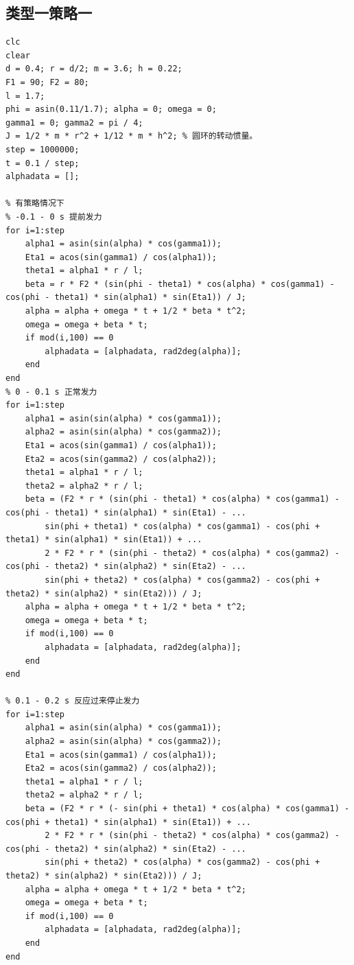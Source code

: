\documentclass{cumcm}
\begin{document}
\subsection{类型一策略一}
\begin{lstlisting}
clc
clear
d = 0.4; r = d/2; m = 3.6; h = 0.22;
F1 = 90; F2 = 80;
l = 1.7;
phi = asin(0.11/1.7); alpha = 0; omega = 0;
gamma1 = 0; gamma2 = pi / 4;
J = 1/2 * m * r^2 + 1/12 * m * h^2; % 圆环的转动惯量。
step = 1000000;
t = 0.1 / step;
alphadata = [];

% 有策略情况下
% -0.1 - 0 s 提前发力
for i=1:step
    alpha1 = asin(sin(alpha) * cos(gamma1));
    Eta1 = acos(sin(gamma1) / cos(alpha1));
    theta1 = alpha1 * r / l;
    beta = r * F2 * (sin(phi - theta1) * cos(alpha) * cos(gamma1) - cos(phi - theta1) * sin(alpha1) * sin(Eta1)) / J;
    alpha = alpha + omega * t + 1/2 * beta * t^2;
    omega = omega + beta * t;
    if mod(i,100) == 0
        alphadata = [alphadata, rad2deg(alpha)];
    end
end
% 0 - 0.1 s 正常发力
for i=1:step
    alpha1 = asin(sin(alpha) * cos(gamma1));
    alpha2 = asin(sin(alpha) * cos(gamma2));
    Eta1 = acos(sin(gamma1) / cos(alpha1));
    Eta2 = acos(sin(gamma2) / cos(alpha2));
    theta1 = alpha1 * r / l;
    theta2 = alpha2 * r / l;
    beta = (F2 * r * (sin(phi - theta1) * cos(alpha) * cos(gamma1) - cos(phi - theta1) * sin(alpha1) * sin(Eta1) - ...
        sin(phi + theta1) * cos(alpha) * cos(gamma1) - cos(phi + theta1) * sin(alpha1) * sin(Eta1)) + ...
        2 * F2 * r * (sin(phi - theta2) * cos(alpha) * cos(gamma2) - cos(phi - theta2) * sin(alpha2) * sin(Eta2) - ...
        sin(phi + theta2) * cos(alpha) * cos(gamma2) - cos(phi + theta2) * sin(alpha2) * sin(Eta2))) / J;
    alpha = alpha + omega * t + 1/2 * beta * t^2;
    omega = omega + beta * t;
    if mod(i,100) == 0
        alphadata = [alphadata, rad2deg(alpha)];
    end
end

% 0.1 - 0.2 s 反应过来停止发力
for i=1:step
    alpha1 = asin(sin(alpha) * cos(gamma1));
    alpha2 = asin(sin(alpha) * cos(gamma2));
    Eta1 = acos(sin(gamma1) / cos(alpha1));
    Eta2 = acos(sin(gamma2) / cos(alpha2));
    theta1 = alpha1 * r / l;
    theta2 = alpha2 * r / l;
    beta = (F2 * r * (- sin(phi + theta1) * cos(alpha) * cos(gamma1) - cos(phi + theta1) * sin(alpha1) * sin(Eta1)) + ...
        2 * F2 * r * (sin(phi - theta2) * cos(alpha) * cos(gamma2) - cos(phi - theta2) * sin(alpha2) * sin(Eta2) - ...
        sin(phi + theta2) * cos(alpha) * cos(gamma2) - cos(phi + theta2) * sin(alpha2) * sin(Eta2))) / J;
    alpha = alpha + omega * t + 1/2 * beta * t^2;
    omega = omega + beta * t;
    if mod(i,100) == 0
        alphadata = [alphadata, rad2deg(alpha)];
    end
end


\end{lstlisting}
\end{document}
